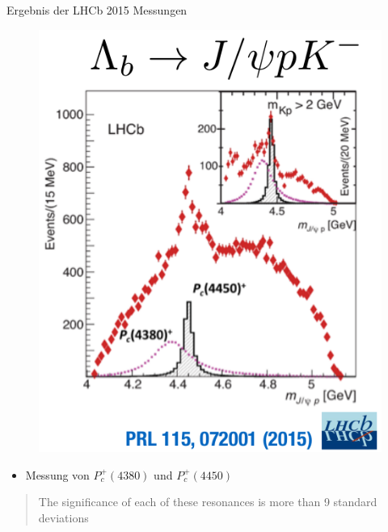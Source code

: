 \documentclass[aspectratio=169]{beamer} %
\begin{document}
    \begin{frame}{Ergebnis der LHCb 2015 Messungen}
      \begin{minipage}{0.38\textwidth}
      \begin{figure}\includegraphics[width=\textwidth, height=0.8\textheight, keepaspectratio]{lhcb-pc4450.png}
        \\\cite[S.~2]{Aaij.2015}\end{figure}
      \end{minipage}
      \hfill
      \begin{minipage}{0.6\textwidth}
        \begin{itemize}
          \item Messung von $P_c^+(4380)$ und $P_c^+(4450)$
        \end{itemize}
        \vspace{2em}
        \begin{quote}\glqq The significance of each of these resonances is more than 9 standard deviations\grqq~\end{quote}~\cite[S.~1]{Aaij.2015}
      \end{minipage}
    \end{frame}
\end{document}
